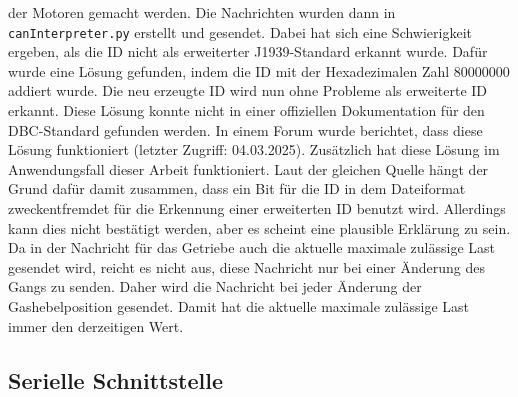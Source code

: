 der Motoren gemacht werden. Die Nachrichten wurden dann in \texttt{canInterpreter.py} erstellt und gesendet.
Dabei hat sich eine Schwierigkeit ergeben, als die ID nicht als erweiterter J1939-Standard erkannt wurde. 
Dafür wurde eine Lösung gefunden, indem die ID mit der Hexadezimalen Zahl 80000000 addiert wurde. Die neu erzeugte ID
wird nun ohne Probleme als erweiterte ID erkannt. Diese Lösung konnte nicht in einer offiziellen Dokumentation für den
DBC-Standard gefunden werden. In einem Forum wurde berichtet, dass diese Lösung funktioniert \cite{cantoolsIssue} (letzter Zugriff: 04.03.2025). 
Zusätzlich hat diese Lösung im Anwendungsfall dieser Arbeit funktioniert. 
Laut der gleichen Quelle hängt der Grund dafür damit zusammen, dass ein Bit für die ID in dem Dateiformat zweckentfremdet für
die Erkennung einer erweiterten ID benutzt wird. Allerdings kann dies nicht bestätigt werden, aber es scheint eine plausible
Erklärung zu sein. \\
Da in der Nachricht für das Getriebe auch die aktuelle maximale zulässige Last gesendet wird, reicht es nicht aus, diese
Nachricht nur bei einer Änderung des Gangs zu senden. Daher wird die Nachricht bei jeder Änderung der Gashebelposition
gesendet. Damit hat die aktuelle maximale zulässige Last immer den derzeitigen Wert.

\subsection{Serielle Schnittstelle}

